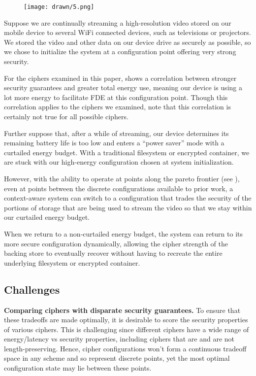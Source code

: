 \begin{figure}[ht]
   \centering
   \texttt{[image: drawn/5.png]}
   \caption{}\label{fig:energy-latency-linearity}
\end{figure}

Suppose we are continually streaming a high-resolution video stored on our
mobile device to several WiFi connected devices, such as televisions or
projectors. We stored the video and other data on our device drive as securely
as possible, so we chose to initialize the system at a configuration point
offering very strong security.

For the ciphers examined in this paper,  shows
a correlation between stronger security guarantees and greater total energy use,
meaning our device is using a lot more energy to facilitate FDE at this
configuration point. Though this correlation applies to the ciphers we examined,
note that this correlation is certainly not true for all possible ciphers.

Further suppose that, after a while of streaming, our device determines its
remaining battery life is too low and enters a ``power saver'' mode with a
curtailed energy budget. With a traditional filesystem or encrypted container, we
are stuck with our high-energy configuration chosen at system initialization.

However, with the ability to operate at points along the pareto frontier (see
), even at points between the discrete configurations
available to prior work, a context-aware system can switch to a configuration
that trades the security of the portions of storage that are being used to
stream the video so that we stay within our curtailed energy budget.

When we return to a non-curtailed energy budget, the system can return to its
more secure configuration dynamically, allowing the cipher strength of the
backing store to eventually recover without having to recreate the entire
underlying filesystem or encrypted container.

\subsection{Challenges}

\textbf{Comparing ciphers with disparate security guarantees.} To ensure that
these tradeoffs are made optimally, it is desirable to score the security
properties of various ciphers. This is challenging since different ciphers have
a wide range of energy/latency vs security properties, including ciphers that
are and are not length-preserving. Hence, cipher configurations won't form a
continuous tradeoff space in any scheme and so represent discrete points, yet
the most optimal configuration state may lie between these points.

